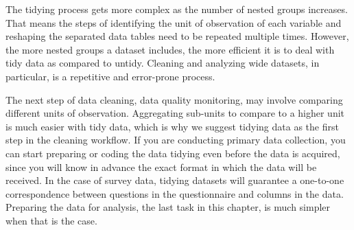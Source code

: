 \documentclass[
]{book}
\begin{document}
The tidying process gets more complex as the number of nested groups increases.
That means the steps of identifying the unit of observation of each variable
and reshaping the separated data tables need to be repeated multiple times.
However, the more nested groups a dataset includes,
the more efficient it is to deal with tidy data as compared to untidy.
Cleaning and analyzing wide datasets, in particular,
is a repetitive and error-prone process.

The next step of data cleaning, data quality monitoring,
may involve comparing different units of observation.
Aggregating sub-units to compare to a higher unit is much easier with tidy data,
which is why we suggest tidying data as the first step in the cleaning workflow.
If you are conducting primary data collection,
you can start preparing or coding the data tidying even before the data is acquired,
since you will know in advance the exact format in which the data will be received.
In the case of survey data,
tidying datasets will guarantee a one-to-one correspondence
between questions in the questionnaire and columns in the data.
Preparing the data for analysis, the last task in this chapter,
is much simpler when that is the case.
\end{document}
